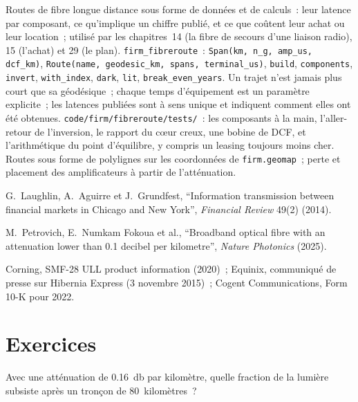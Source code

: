 \begin{build}
 Routes de fibre longue distance sous forme de données et de calculs~: leur latence par composant, ce qu'implique un chiffre publié, et ce que coûtent leur achat ou
leur location~; utilisé par les chapitres~14 (la fibre de secours d'une liaison radio), 15 (l'achat) et 29 (le plan).
 \texttt{firm\_fibreroute}~: \texttt{Span(km, n\_g, amp\_us, dcf\_km)}, \texttt{Route(name, geodesic\_km, spans, terminal\_us)},
\texttt{build}, \texttt{components}, \texttt{invert}, \texttt{with\_index}, \texttt{dark}, \texttt{lit}, \texttt{break\_even\_years}.
 Un trajet n'est jamais plus court que sa géodésique~; chaque temps d'équipement est un paramètre explicite~; les latences publiées sont à sens unique et
  indiquent comment elles ont été obtenues.
 \texttt{code/firm/fibreroute/tests/}~: les composants à la main, l'aller-retour de l'inversion, le rapport du cœur creux, une bobine de DCF, et
l'arithmétique du point d'équilibre, y compris un leasing toujours moins cher.
 Routes sous forme de polylignes sur les coordonnées de \texttt{firm.geomap}~; perte et placement des amplificateurs à partir de l'atténuation.
\end{build}

\begin{omsources}
\item G.~Laughlin, A.~Aguirre et J.~Grundfest, ``Information transmission between financial markets in Chicago and New York'', \emph{Financial
Review} 49(2) (2014).
\item M.~Petrovich, E.~Numkam Fokoua et al., ``Broadband optical fibre with an attenuation lower than 0.1 decibel per kilometre'', \emph{Nature
Photonics} (2025).
\item Corning, SMF-28 ULL product information (2020)~; Equinix, communiqué de presse sur Hibernia Express (3 novembre 2015)~; Cogent Communications, Form 10-K
pour 2022.
\end{omsources}

\section{Exercices}

\begin{exercise}[$\star$]\label{exo:nw:long-haul-fibre:1}
Avec une atténuation de \qty{0.16}{\decibel} par kilomètre, quelle fraction de la lumière subsiste après un tronçon de 80~kilomètres~?
\end{exercise}

